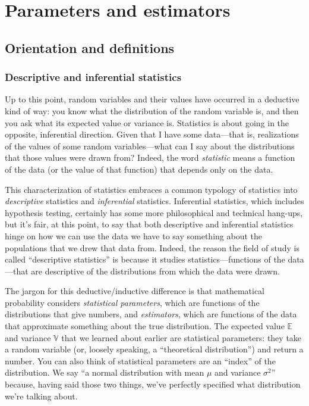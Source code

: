 
\chapter{Parameters and estimators}

\section{Orientation and definitions}

\subsection{Descriptive and inferential statistics}

Up to this point, random variables and their values have occurred in a
deductive kind of way: you know what the distribution of the random variable
is, and then you ask what its expected value or variance is. Statistics is
about going in the opposite, inferential direction. Given that I have some data---that is,
realizations of the values of some random variables---what can I say about the
distributions that those values were drawn from? Indeed, the word \emph{statistic}
means a function of the data (or the value of that function) that depends only
on the data.

This characterization of statistics embraces a common typology of statistics into
\emph{descriptive} statistics and \emph{inferential} statistics. Inferential
statistics, which includes hypothesis testing, certainly has some more
philosophical and technical hang-ups, but it's fair, at this point, to say
that both descriptive and inferential statistics hinge on how we can use the
data we have to say something about the populations that we drew that data
from. Indeed, the reason the field of study is called ``descriptive statistics''
is because it studies statistics---functions of the data---that are descriptive
of the distributions from which the data were drawn.

The jargon for this deductive/inductive difference is that mathematical
probability considers \emph{statistical parameters}, which are functions of
the distributions that give numbers, and \emph{estimators}, which are
functions of the data that approximate something about the true distribution.
The expected value $\mathbb{E}$ and variance $\mathbb{V}$ that we learned
about earlier are statistical parameters: they take a random variable (or, loosely
speaking, a ``theoretical distribution'') and
return a number. You can also think of
statistical parameters are an ``index'' of the distribution. We say ``a normal
distribution with mean $\mu$ and variance $\sigma^2$'' because, having said
those two things, we've perfectly specified what distribution we're talking
about.

